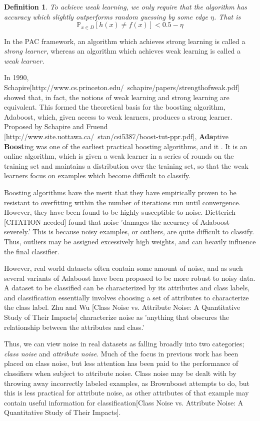 \documentclass[11pt]{article}
\newtheorem{definition}{Definition}[section]
\newcommand{\?}[0]{\vert}
\begin{document}
\begin{definition}
To achieve \textit{weak learning}, we only require that the algorithm has accuracy which slightly outperforms random guessing by some edge $\eta$. That is 
$$\mathbb{P}_{x\in D}[h(x)\neq f(x)] < 0.5 - \eta$$
\end{definition}


In the PAC framework, an algorithm which achieves strong learning is called a \textit{strong learner}, whereas an algorithm which achieves weak learning is called a \textit{weak learner.}

In 1990, Schapire[http://www.cs.princeton.edu/~schapire/papers/strengthofweak.pdf] showed that, in fact, the notions of weak learning and strong learning are equivalent. This formed the theoretical basis for the boosting algorithm, Adaboost, which, given access to weak learners, produces a strong learner. Proposed by Schapire and Fruend [http://www.site.uottawa.ca/~stan/csi5387/boost-tut-ppr.pdf], \textbf{Ada}ptive \textbf{Boost}ing was one of the earliest practical boosting algorithms, and it . It is an online algorithm, which is given a weak learner in a series of rounds on the training set and maintains a distribution over the training set, so that the weak learners focus on examples which become difficult to classify.

Boosting algorithms have the merit that they have empirically proven to be resistant to overfitting within the number of iterations run until convergence. However, they have been found to be highly susceptible to noise. Dietterich [CITATION needed] found that noise 'damages the accuracy of Adaboost severely.' This is because noisy examples, or outliers, are quite difficult to classify. Thus, outliers may be assigned excessively high weights, and can heavily influence the final classifier.  

However, real world datasets often contain some amount of noise, and as such several variants of Adaboost have been proposed to be more robust to noisy data. A dataset to be classified can be characterized by its attributes and class labels, and classification essentially involves choosing a set of attributes to characterize the class label. Zhu and Wu [Class Noise vs. Attribute Noise: A Quantitative Study
of Their Impacts] characterize noise as 'anything that obscures the relationship between the
attributes and class.' 

Thus, we can view noise in real datasets as falling broadly into two categories; \textit{class noise} and \textit{attribute noise}. Much of the focus in previous work has been placed on class noise, but less attention has been paid to the performance of classifiers when subject to attribute noise. Class noise may be dealt with by throwing away incorrectly labeled examples, as Brownboost attempts to do, but this is less practical for attribute noise, as other attributes of that example may contain useful information for classification[Class Noise vs. Attribute Noise: A Quantitative Study
of Their Impacts]. 
 
\end{document}
